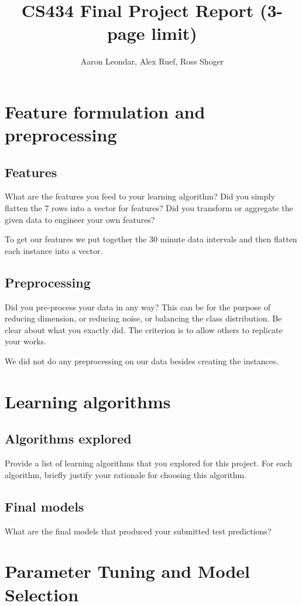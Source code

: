 \documentclass[11pt,a4paper]{article}
\title{CS434 Final Project Report (3-page limit)}
\author{Aaron Leondar, Alex Ruef, Ross Shoger}
\date{}
\begin{document}
\maketitle
\section{Feature formulation and preprocessing}
\subsection{Features} What are the features you feed to your learning algorithm? Did you simply flatten the 7 rows into a vector for features? Did you transform or aggregate the given data to engineer your own features?

To get our features we put together the 30 minute data intervals and then flatten each instance into a vector.

\subsection{Preprocessing}
Did you pre-process your data in any way? This can be for the purpose of reducing dimension, or reducing noise, or balancing the class distribution. Be clear about what you exactly did. The criterion is to allow others to replicate your works.

We did not do any preprocessing on our data besides creating the instances.

\section{Learning algorithms}
\subsection{Algorithms explored}
Provide a list of learning algorithms that you explored for this project. For each algorithm, briefly justify your rationale for choosing this algorithm.

\subsection{Final models}
What are the final models that produced your submitted test predictions?

\section{Parameter Tuning and Model Selection }
\end{document}
